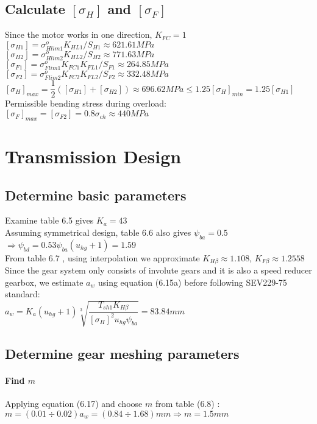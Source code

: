 \subsection{Calculate $ [\sigma_H] $ and $ [\sigma_F] $}
Since the motor works in one direction, $ K_{FC} = 1$\\
$ [\sigma_{H1}] = \sigma_{Hlim1}^oK_{HL1}/S_{H1} \approx 621.61\unit{MPa}$\\
$ [\sigma_{H2}] = \sigma_{Hlim2}^oK_{HL2}/S_{H2} \approx 771.63\unit{MPa}$\\
$ [\sigma_{F1}] = \sigma_{Flim1}^oK_{FC1}K_{FL1}/S_{F1} \approx 264.85\unit{MPa}$\\
$ [\sigma_{F2}] = \sigma_{Flim2}^oK_{FC2}K_{FL2}/S_{F2} \approx 332.48\unit{MPa}$\\
$ [\sigma_H]_{max} = \dfrac{1}{2}\left( [\sigma_{H1}]+[\sigma_{H2}]\right)  \approx 696.62\unit{MPa}\leq 1.25[\sigma_H]_{min} = 1.25[\sigma_{H1}]$\\
Permissible bending stress during overload:\\
$ [\sigma_F]_{max} = [\sigma_{F2}] = 0.8\sigma_{ch} \approx 440\unit{MPa} $
\section{Transmission Design}
\subsection{Determine basic parameters}
Examine table 6.5  gives $ K_a = 43 $\\
Assuming symmetrical design, table 6.6  also gives $ \psi_{ba} = 0.5$\\
$ \Rightarrow \psi_{bd} = 0.53\psi_{ba}(u_{hg}+1) = 1.59$\\
From table 6.7 , using interpolation we approximate $ K_{H\beta} \approx 1.108 $, $ K_{F\beta} \approx 1.2558 $\\
Since the gear system only consists of involute gears and it is also a speed reducer gearbox, we estimate $ a_w $ using equation (6.15a)  before following SEV229-75 standard:\\
$ a_{w} = K_a(u_{hg}+1)\sqrt[3]{\dfrac{T_{sh1}K_{H\beta}}{[\sigma_H]^2u_{hg}\psi_{ba}}} = 83.84\unit{mm}$
\subsection{Determine gear meshing parameters}
\paragraph{Find $ m $} Applying equation (6.17)  and choose $ m $ from table (6.8) :\\
$ m = (0.01\div0.02)a_w = (0.84\div1.68) \unit{mm} \Rightarrow m=1.5\unit{mm}$
